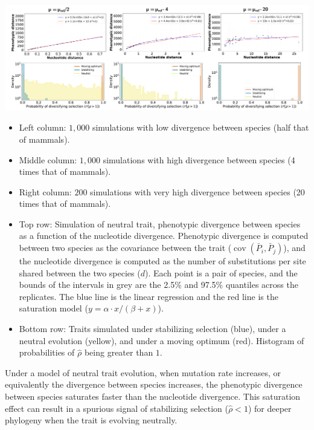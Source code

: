 \documentclass{article}
\newcommand{\Multiply}{\cdot}
\DeclareMathOperator{\Cov}{\text{cov}}
\newcommand{\Spi}{i}
\newcommand{\Spj}{j}
\newcommand{\Trait}{P}
\newcommand{\MeanTrait}{\bar{\Trait}}
\newcommand{\VarPhy}{\Cov \left( \MeanTrait_{\Spi}, \MeanTrait_{\Spj}\right)}
\newcommand{\NI}{\rho}
\newcommand{\EstNI}{\widehat{\rho}}
\providecommand{\DIFaddtex}[1]{{\protect\color{blue}\uwave{#1}}} %
\providecommand{\DIFdeltex}[1]{{\protect\color{red}\sout{#1}}}                      %
\providecommand{\DIFaddbegin}{} %
\providecommand{\DIFaddend}{} %
\providecommand{\DIFdelbegin}{} %
\providecommand{\DIFdelend}{} %
\providecommand{\DIFadd}[1]{\texorpdfstring{\DIFaddtex{#1}}{#1}} %
\providecommand{\DIFdel}[1]{\texorpdfstring{\DIFdeltex{#1}}{}} %
\newcommand{\DIFscaledelfig}{0.5}
\newlength{\DIFdelgraphicswidth} %
\newlength{\DIFdelgraphicsheight} %
\newcommand{\DIFaddincludegraphics}[2][]{{\color{blue}\fbox{\DIFOincludegraphics[#1]{#2}}}} %
\newcommand{\DIFdelincludegraphics}[2][]{%
\sbox{\DIFdelgraphicsbox}{\DIFOincludegraphics[#1]{#2}}%
\settoboxwidth{\DIFdelgraphicswidth}{\DIFdelgraphicsbox} %
\settoboxtotalheight{\DIFdelgraphicsheight}{\DIFdelgraphicsbox} %
\scalebox{\DIFscaledelfig}{%
\parbox[b]{\DIFdelgraphicswidth}{\usebox{\DIFdelgraphicsbox}\\[-\baselineskip] \rule{\DIFdelgraphicswidth}{0em}}\llap{\resizebox{\DIFdelgraphicswidth}{\DIFdelgraphicsheight}{%
\setlength{\unitlength}{\DIFdelgraphicswidth}%
\begin{picture}(1,1)%
\thicklines\linethickness{2pt} %
{\color[rgb]{1,0,0}\put(0,0){\framebox(1,1){}}}%
{\color[rgb]{1,0,0}\put(0,0){\line( 1,1){1}}}%
{\color[rgb]{1,0,0}\put(0,1){\line(1,-1){1}}}%
\end{picture}%
}\hspace*{3pt}}} %
} %
\DeclareRobustCommand{\DIFaddbegin}{\DIFOaddbegin \let\includegraphics\DIFaddincludegraphics} %
\DeclareRobustCommand{\DIFaddend}{\DIFOaddend \let\includegraphics\DIFOincludegraphics} %
\DeclareRobustCommand{\DIFdelbegin}{\DIFOdelbegin \let\includegraphics\DIFdelincludegraphics} %
\DeclareRobustCommand{\DIFdelend}{\DIFOaddend \let\includegraphics\DIFOincludegraphics} %
\begin{document}
\begin{center}
    \includegraphics[width=1.0\textwidth, page=1] {figureS2}
    \label{fig:supp-distance}
\end{center}
\begin{itemize}
    \item Left column: $1,000$ simulations with low divergence between species (half that of mammals).
    \item Middle column: $1,000$ simulations with high divergence between species (4 times that of mammals).
    \item Right column: $200$ simulations with very high divergence between species (20 times that of mammals).
    \item Top row: Simulation of neutral trait, phenotypic divergence between species as a function of the nucleotide divergence. Phenotypic divergence is computed between two species as the covariance between the trait ($\VarPhy$), and the nucleotide divergence is computed as the number of substitutions per site shared between the two species ($d$). Each point is a pair of species, and the bounds of the intervals in grey are the 2.5\% and 97.5\% quantiles across the replicates. The blue line is the linear regression and the red line is the saturation model ($y = \alpha \Multiply x / (\beta + x)$).
    \item Bottom row: Traits simulated under stabilizing selection (blue), under a neutral evolution (yellow), and under a moving optimum (red). Histogram of probabilities of \DIFdelbegin \DIFdel{$\EstNI$ }\DIFdelend \DIFaddbegin \DIFadd{$\NI$ }\DIFaddend being greater than $1$.
\end{itemize}
Under a model of neutral trait evolution, when mutation rate increases, or equivalently the divergence between species increases, the phenotypic divergence between species saturates faster than the nucleotide divergence.
This saturation effect can result in a spurious signal of stabilizing selection (\DIFdelbegin \DIFdel{$\EstNI < 1$}\DIFdelend \DIFaddbegin \DIFadd{$\NI < 1$}\DIFaddend ) for deeper phylogeny when the trait is evolving neutrally.
\end{document}
